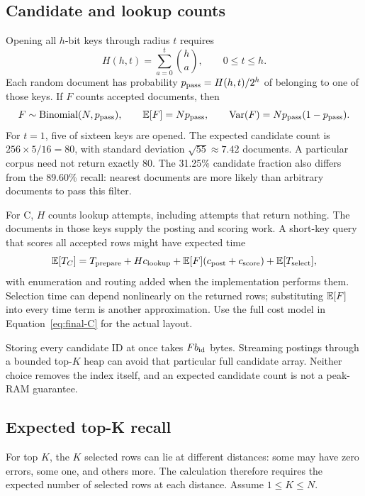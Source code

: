 \subsection{Candidate and lookup counts}
Opening all $h$-bit keys through radius $t$ requires
\begin{equation}
H(h,t)=\sum_{a=0}^{t}\binom{h}{a},\qquad 0\le t\le h.
\label{eq:teaching-keys}
\end{equation}
Each random document has probability $p_{\rm pass}=H(h,t)/2^h$ of belonging to one of those keys.
If $F$ counts accepted documents, then
\begin{equation}
F\sim\operatorname{Binomial}(N,p_{\rm pass}),\qquad
\mathbb E[F]=Np_{\rm pass},\qquad
\operatorname{Var}(F)=Np_{\rm pass}(1-p_{\rm pass}).
\label{eq:teaching-candidates}
\end{equation}
For $t=1$, five of sixteen keys are opened. The expected candidate count is
$256\times5/16=80$, with standard deviation $\sqrt{55}\approx7.42$ documents. A particular
corpus need not return exactly 80. The 31.25\% candidate fraction also differs from the 89.60\%
recall: nearest documents are more likely than arbitrary documents to pass this filter.

For C, $H$ counts lookup attempts, including attempts that return nothing. The documents in
those keys supply the posting and scoring work. A short-key query that scores all accepted
rows might have expected time
\[
\mathbb E[T_C]=T_{\rm prepare}+Hc_{\rm lookup}
       +\mathbb E[F](c_{\rm post}+c_{\rm score})+\mathbb E[T_{\rm select}],
\]
with enumeration and routing added when the implementation performs them. Selection time can
depend nonlinearly on the returned rows; substituting $\mathbb E[F]$ into every time term is another
approximation. Use the full cost model in Equation~\eqref{eq:final-C} for the actual layout.

Storing every candidate ID at once takes $F b_{\rm id}$ bytes. Streaming postings through a
bounded top-$K$ heap can avoid that particular full candidate array. Neither choice removes
the index itself, and an expected candidate count is not a peak-RAM guarantee.

\subsection{Expected top-K recall}
For top $K$, the $K$ selected rows can lie at different distances: some may have zero errors,
some one, and others more. The calculation therefore requires the expected number of selected
rows at each distance.
Assume $1\le K\le N$.


